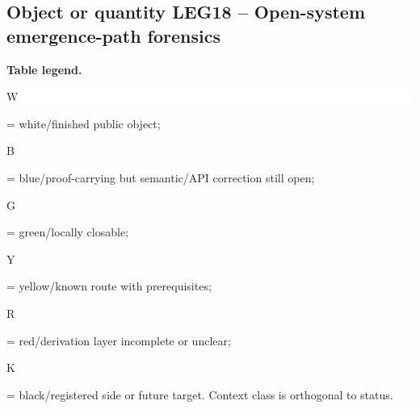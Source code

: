 \subsection*{Object or quantity LEG18 -- Open-system emergence-path forensics}
\hypertarget{objproof:LEG18}{}
\par\smallskip\noindent\begin{minipage}{0.99\linewidth}\footnotesize\raggedright\textbf{Table legend.} \colorbox{white}{\strut W} = white/finished public object; \colorbox{cyan!20}{\strut B} = blue/proof-carrying but semantic/API correction still open; \colorbox{green!18}{\strut G} = green/locally closable; \colorbox{yellow!25}{\strut Y} = yellow/known route with prerequisites; \colorbox{red!20}{\strut R} = red/derivation layer incomplete or unclear; \colorbox{black!18}{\strut K} = black/registered side or future target. Context class is orthogonal to status.\end{minipage}\par\vspace{0.25em}
